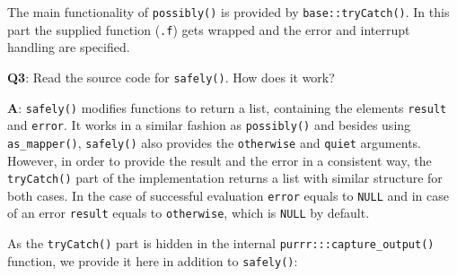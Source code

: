 \documentclass[
]{krantz}
\makeatletter
\newenvironment{Shaded}{\begin{snugshade}}{\end{snugshade}}
\newcommand{\CommentTok}[1]{\textcolor[rgb]{0.56,0.35,0.01}{\textit{#1}}}
\newcommand{\NormalTok}[1]{#1}
\newenvironment{kframe}{%
\medskip{}
\setlength{\fboxsep}{.8em}
 \def\at@end@of@kframe{}%
 \ifinner\ifhmode%
  \def\at@end@of@kframe{\end{minipage}}%
  \begin{minipage}{\columnwidth}%
 \fi\fi%
 \def\FrameCommand##1{\hskip\@totalleftmargin \hskip-\fboxsep
 \colorbox{shadecolor}{##1}\hskip-\fboxsep
     \hskip-\linewidth \hskip-\@totalleftmargin \hskip\columnwidth}%
 \MakeFramed {\advance\hsize-\width
   \@totalleftmargin\z@ \linewidth\hsize
   \@setminipage}}%
 {\par\unskip\endMakeFramed%
 \at@end@of@kframe}
\renewenvironment{Shaded}{\begin{kframe}}{\end{kframe}}
\renewcommand{\CommentTok} [1]{\textcolor[rgb]{0.38,0.63,0.69}{{#1}}}
\renewcommand{\NormalTok}  [1]{{#1}}
\makeatother
\begin{document}
\begin{Shaded}
\end{Shaded}

The main functionality of \texttt{possibly()} is provided by \texttt{base::tryCatch()}. In this part the supplied function (\texttt{.f}) gets wrapped and the error and interrupt handling are specified.

\textbf{{Q3}}: Read the source code for \texttt{safely()}. How does it work?

\textbf{{A}}: \texttt{safely()} modifies functions to return a list, containing the elements \texttt{result} and \texttt{error}. It works in a similar fashion as \texttt{possibly()} and besides using \texttt{as\_mapper()}, \texttt{safely()} also provides the \texttt{otherwise} and \texttt{quiet} arguments. However, in order to provide the result and the error in a consistent way, the \texttt{tryCatch()} part of the implementation returns a list with similar structure for both cases. In the case of successful evaluation \texttt{error} equals to \texttt{NULL} and in case of an error \texttt{result} equals to \texttt{otherwise}, which is \texttt{NULL} by default.

As the \texttt{tryCatch()} part is hidden in the internal \texttt{purrr:::capture\_output()} function, we provide it here in addition to \texttt{safely()}:
\end{document}
